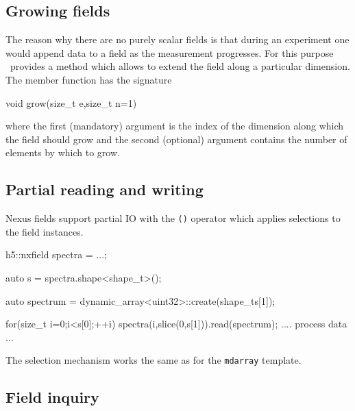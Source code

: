 \subsection{Growing fields}

\begin{figure}
\end{figure}

The reason why there are no purely scalar fields is that during an experiment 
one would append data to a field as the measurement progresses. 
For this purpose \nxfield\ provides a  method which allows to 
extend the field along a particular dimension. The member function has the 
signature
\begin{cppcode}
void grow(size_t e,size_t n=1)
\end{cppcode}
where the first (mandatory) argument is the index of the dimension along which
the field should grow and the second (optional) argument contains the number of 
elements by which to grow. 

\subsection{Partial reading and writing}

Nexus fields support partial IO with the {\tt ()} operator which applies
selections to the field instances. 
\begin{cppcode}
h5::nxfield spectra = ...;

auto s = spectra.shape<shape_t>();

auto spectrum = dynamic_array<uint32>::create(shape_t{s[1]});

for(size_t i=0;i<s[0];++i)
{
    spectra(i,slice(0,s[1])).read(spectrum);
    .... process data ...
}
\end{cppcode}
The selection mechanism works the same as for the {\tt mdarray} template. 

\subsection{Field inquiry}
